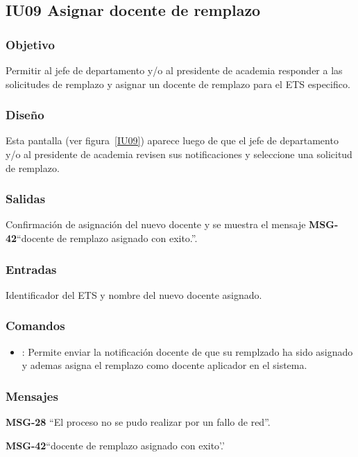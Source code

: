 \subsection{IU09 Asignar docente de remplazo}

\subsubsection{Objetivo}
Permitir al jefe de departamento y/o al presidente de academia responder a las solicitudes de remplazo y asignar un docente de remplazo para el ETS especifico.

\subsubsection{Diseño}
Esta pantalla  (ver figura~\ref{IU09}) aparece luego de que el jefe de departamento y/o al presidente de academia revisen sus notificaciones y seleccione una solicitud de remplazo.


\subsubsection{Salidas}
Confirmación de asignación del nuevo docente y se muestra el mensaje {\bf MSG-42}{``docente de remplazo asignado con exito.''}.

\subsubsection{Entradas}
Identificador del ETS y nombre del nuevo docente asignado.

\subsubsection{Comandos}
\begin{itemize}
	\item {}: Permite enviar la notificación docente de que su remplzado ha sido asignado y ademas asigna el remplazo como docente aplicador en el sistema.
\end{itemize}

\subsubsection{Mensajes}

\begin{Citemize}
	\item {\bf MSG-28} {``El proceso no se pudo realizar por un fallo de red''.}
	\item {\bf MSG-42}{``docente de remplazo asignado con exito'.'}
\end{Citemize}


